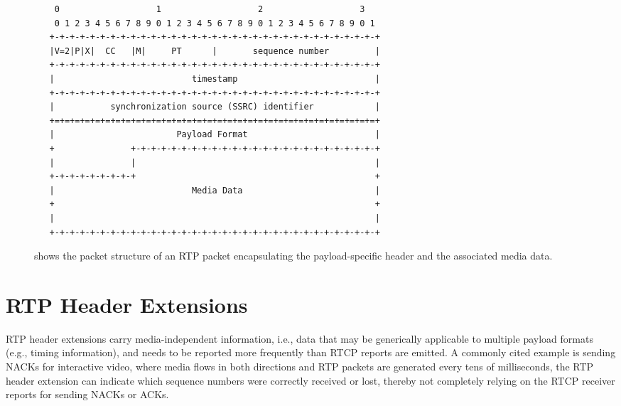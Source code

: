 \begin{figure}[!h]
\begin{spacing}{0.5}
{\footnotesize
\begin{verbatim}
    0                   1                   2                   3
    0 1 2 3 4 5 6 7 8 9 0 1 2 3 4 5 6 7 8 9 0 1 2 3 4 5 6 7 8 9 0 1
   +-+-+-+-+-+-+-+-+-+-+-+-+-+-+-+-+-+-+-+-+-+-+-+-+-+-+-+-+-+-+-+-+
   |V=2|P|X|  CC   |M|     PT      |       sequence number         |
   +-+-+-+-+-+-+-+-+-+-+-+-+-+-+-+-+-+-+-+-+-+-+-+-+-+-+-+-+-+-+-+-+
   |                           timestamp                           |
   +-+-+-+-+-+-+-+-+-+-+-+-+-+-+-+-+-+-+-+-+-+-+-+-+-+-+-+-+-+-+-+-+
   |           synchronization source (SSRC) identifier            |
   +=+=+=+=+=+=+=+=+=+=+=+=+=+=+=+=+=+=+=+=+=+=+=+=+=+=+=+=+=+=+=+=+
   |                        Payload Format                         |
   +               +-+-+-+-+-+-+-+-+-+-+-+-+-+-+-+-+-+-+-+-+-+-+-+-+
   |               |                                               |
   +-+-+-+-+-+-+-+-+                                               +
   |                           Media Data                          |
   +                                                               +
   |                                                               |
   +-+-+-+-+-+-+-+-+-+-+-+-+-+-+-+-+-+-+-+-+-+-+-+-+-+-+-+-+-+-+-+-+
\end{verbatim}
}
\end{spacing}
\caption{shows the packet structure of an RTP packet encapsulating the
payload-specific header and the associated media data.}
\label{fig:3:pt.fmt}
\end{figure}


\section{RTP Header Extensions}

RTP header extensions carry media-independent information, i.e., data that may
be generically applicable to multiple payload formats (e.g., timing
information), and needs to be reported more frequently than RTCP reports are
emitted. A commonly cited example is sending NACKs for interactive video,
where media flows in both directions and RTP packets are generated every tens
of milliseconds, the RTP header extension can indicate which sequence numbers
were correctly received or lost, thereby not completely relying on the RTCP
receiver reports for sending NACKs or ACKs.

